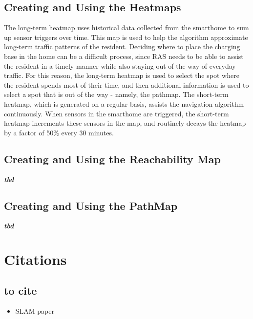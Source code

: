 \documentclass[11pt, conference, a4paper]{IEEEtran}
\begin{document}
\subsection{Creating and Using the Heatmaps}
The long-term heatmap uses historical data collected from the smarthome to sum up sensor triggers over time. This map is used to help the algorithm approximate long-term traffic patterns of the resident. Deciding where to place the charging base in the home can be a difficult process, since RAS needs to be able to assist the resident in a timely manner while also staying out of the way of everyday traffic. For this reason, the long-term heatmap is used to select the spot where the resident spends most of their time, and then additional information is used to select a spot that is out of the way - namely, the pathmap. 
The short-term heatmap, which is generated on a regular basis, assists the navigation algorithm continuously. When sensors in the smarthome are triggered, the short-term heatmap increments these sensors in the map, and routinely decays the heatmap by a factor of 50\% every 30 minutes. 

\subsection{Creating and Using the Reachability Map}
\textit{\textbf{tbd}} 

\subsection{Creating and Using the PathMap}
\textit{\textbf{tbd}}

\section{Citations}
\subsection{to cite}
\begin{itemize}
    \item SLAM paper
\end{itemize}
\end{document}
